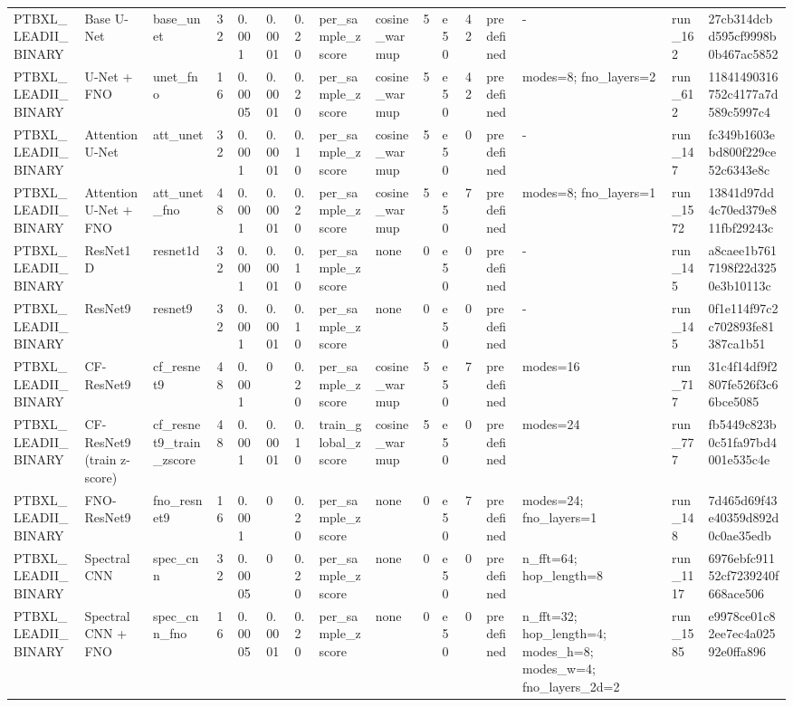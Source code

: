 \begin{longtable}{llllllllllllllll}
PTBXL\_LEADII\_BINARY & Base U-Net & base\_unet & 32 & 0.001 & 0.0001 & 0.20 & per\_sample\_zscore & cosine\_warmup & 5 & e50 & 42 & predefined & - & run\_162 & 27cb314dcbd595cf9998b0b467ac5852 \\
PTBXL\_LEADII\_BINARY & U-Net + FNO & unet\_fno & 16 & 0.0005 & 0.0001 & 0.20 & per\_sample\_zscore & cosine\_warmup & 5 & e50 & 42 & predefined & modes=8; fno\_layers=2 & run\_612 & 11841490316752c4177a7d589c5997c4 \\
PTBXL\_LEADII\_BINARY & Attention U-Net & att\_unet & 32 & 0.001 & 0.0001 & 0.10 & per\_sample\_zscore & cosine\_warmup & 5 & e50 & 0 & predefined & - & run\_147 & fc349b1603ebd800f229ce52c6343e8c \\
PTBXL\_LEADII\_BINARY & Attention U-Net + FNO & att\_unet\_fno & 48 & 0.001 & 0.0001 & 0.20 & per\_sample\_zscore & cosine\_warmup & 5 & e50 & 7 & predefined & modes=8; fno\_layers=1 & run\_1572 & 13841d97dd4c70ed379e811fbf29243c \\
PTBXL\_LEADII\_BINARY & ResNet1D & resnet1d & 32 & 0.001 & 0.0001 & 0.10 & per\_sample\_zscore & none & 0 & e50 & 0 & predefined & - & run\_145 & a8caee1b7617198f22d3250e3b10113c \\
PTBXL\_LEADII\_BINARY & ResNet9 & resnet9 & 32 & 0.001 & 0.0001 & 0.10 & per\_sample\_zscore & none & 0 & e50 & 0 & predefined & - & run\_145 & 0f1e114f97c2c702893fe81387ca1b51 \\
PTBXL\_LEADII\_BINARY & CF-ResNet9 & cf\_resnet9 & 48 & 0.001 & 0 & 0.20 & per\_sample\_zscore & cosine\_warmup & 5 & e50 & 7 & predefined & modes=16 & run\_717 & 31c4f14df9f2807fe526f3c66bce5085 \\
PTBXL\_LEADII\_BINARY & CF-ResNet9 (train z-score) & cf\_resnet9\_train\_zscore & 48 & 0.001 & 0.0001 & 0.10 & train\_global\_zscore & cosine\_warmup & 5 & e50 & 0 & predefined & modes=24 & run\_777 & fb5449c823b0c51fa97bd4001e535c4e \\
PTBXL\_LEADII\_BINARY & FNO-ResNet9 & fno\_resnet9 & 16 & 0.001 & 0 & 0.20 & per\_sample\_zscore & none & 0 & e50 & 7 & predefined & modes=24; fno\_layers=1 & run\_148 & 7d465d69f43e40359d892d0c0ae35edb \\
PTBXL\_LEADII\_BINARY & Spectral CNN & spec\_cnn & 32 & 0.0005 & 0 & 0.20 & per\_sample\_zscore & none & 0 & e50 & 0 & predefined & n\_fft=64; hop\_length=8 & run\_1117 & 6976ebfc91152cf7239240f668ace506 \\
PTBXL\_LEADII\_BINARY & Spectral CNN + FNO & spec\_cnn\_fno & 16 & 0.0005 & 0.0001 & 0.20 & per\_sample\_zscore & none & 0 & e50 & 0 & predefined & n\_fft=32; hop\_length=4; modes\_h=8; modes\_w=4; fno\_layers\_2d=2 & run\_1585 & e9978ce01c82ee7ec4a02592e0ffa896 \\

\end{longtable}
